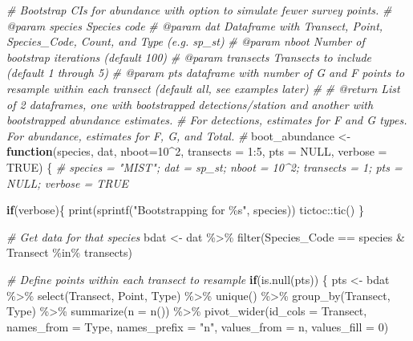 \documentclass[
]{article}
\newenvironment{Shaded}{\begin{snugshade}}{\end{snugshade}}
\newcommand{\AttributeTok}[1]{\textcolor[rgb]{0.77,0.63,0.00}{#1}}
\newcommand{\CommentTok}[1]{\textcolor[rgb]{0.56,0.35,0.01}{\textit{#1}}}
\newcommand{\ConstantTok}[1]{\textcolor[rgb]{0.00,0.00,0.00}{#1}}
\newcommand{\ControlFlowTok}[1]{\textcolor[rgb]{0.13,0.29,0.53}{\textbf{#1}}}
\newcommand{\DecValTok}[1]{\textcolor[rgb]{0.00,0.00,0.81}{#1}}
\newcommand{\FunctionTok}[1]{\textcolor[rgb]{0.00,0.00,0.00}{#1}}
\newcommand{\NormalTok}[1]{#1}
\newcommand{\OtherTok}[1]{\textcolor[rgb]{0.56,0.35,0.01}{#1}}
\newcommand{\SpecialCharTok}[1]{\textcolor[rgb]{0.00,0.00,0.00}{#1}}
\newcommand{\StringTok}[1]{\textcolor[rgb]{0.31,0.60,0.02}{#1}}
\begin{document}
\begin{Shaded}
\begin{Highlighting}[]
\CommentTok{\# Bootstrap CIs for abundance with option to simulate fewer survey points.}
\CommentTok{\# @param species Species code}
\CommentTok{\# @param dat Dataframe with Transect, Point, Species\_Code, Count, and Type (e.g. sp\_st)}
\CommentTok{\# @param nboot Number of bootstrap iterations (default 100)}
\CommentTok{\# @param transects Transects to include (default 1 through 5)}
\CommentTok{\# @param pts dataframe with number of G and F points to resample within each transect (default all, see examples later)}
\CommentTok{\#}
\CommentTok{\# @return List of 2 dataframes, one with bootstrapped detections/station and another with bootstrapped abundance estimates. }
\CommentTok{\#         For detections, estimates for F and G types. For abundance, estimates for F, G, and Total.}
\CommentTok{\#}
\NormalTok{boot\_abundance }\OtherTok{\textless{}{-}} \ControlFlowTok{function}\NormalTok{(species, dat, }\AttributeTok{nboot=}\DecValTok{10}\SpecialCharTok{\^{}}\DecValTok{2}\NormalTok{, }\AttributeTok{transects =} \DecValTok{1}\SpecialCharTok{:}\DecValTok{5}\NormalTok{, }\AttributeTok{pts =} \ConstantTok{NULL}\NormalTok{, }\AttributeTok{verbose =} \ConstantTok{TRUE}\NormalTok{) \{}
  \CommentTok{\# species = "MIST"; dat = sp\_st; nboot = 10\^{}2; transects = 1; pts = NULL; verbose = TRUE}
  
  \ControlFlowTok{if}\NormalTok{(verbose)\{}
    \FunctionTok{print}\NormalTok{(}\FunctionTok{sprintf}\NormalTok{(}\StringTok{"Bootstrapping for \%s"}\NormalTok{, species))}
\NormalTok{    tictoc}\SpecialCharTok{::}\FunctionTok{tic}\NormalTok{()}
\NormalTok{  \}}
  
  \CommentTok{\# Get data for that species}
\NormalTok{  bdat }\OtherTok{\textless{}{-}}\NormalTok{ dat }\SpecialCharTok{\%\textgreater{}\%}
          \FunctionTok{filter}\NormalTok{(Species\_Code }\SpecialCharTok{==}\NormalTok{ species }\SpecialCharTok{\&}
\NormalTok{                   Transect }\SpecialCharTok{\%in\%}\NormalTok{ transects)}
  
  \CommentTok{\# Define points within each transect to resample}
  \ControlFlowTok{if}\NormalTok{(}\FunctionTok{is.null}\NormalTok{(pts)) \{}
\NormalTok{    pts }\OtherTok{\textless{}{-}}\NormalTok{ bdat }\SpecialCharTok{\%\textgreater{}\%}
            \FunctionTok{select}\NormalTok{(Transect, Point, Type) }\SpecialCharTok{\%\textgreater{}\%}
            \FunctionTok{unique}\NormalTok{() }\SpecialCharTok{\%\textgreater{}\%}
            \FunctionTok{group\_by}\NormalTok{(Transect, Type) }\SpecialCharTok{\%\textgreater{}\%}
            \FunctionTok{summarize}\NormalTok{(}\AttributeTok{n =} \FunctionTok{n}\NormalTok{()) }\SpecialCharTok{\%\textgreater{}\%}
            \FunctionTok{pivot\_wider}\NormalTok{(}\AttributeTok{id\_cols =}\NormalTok{ Transect,}
                        \AttributeTok{names\_from =}\NormalTok{ Type,}
                        \AttributeTok{names\_prefix =} \StringTok{"n"}\NormalTok{,}
                        \AttributeTok{values\_from =}\NormalTok{ n,}
                        \AttributeTok{values\_fill =} \DecValTok{0}\NormalTok{)}
    

\end{Highlighting}
\end{Shaded}
\end{document}
